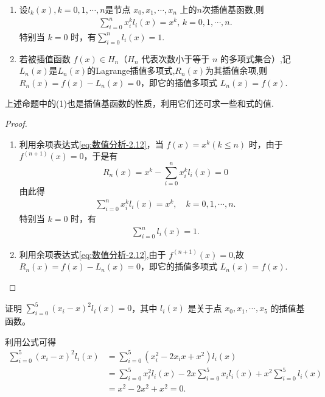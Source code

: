 \documentclass[../../main.tex]{subfiles}
\begin{document}
\begin{proposition}\label{proposition:插值基函数和插值余项的性质}
\begin{enumerate}[(1)]
\item 设$l_k(x),k=0,1,\cdots,n$是节点 $x_0, x_1, \cdots, x_n$ 上的$n$次插值基函数,则
\begin{align*}
\sum_{i = 0}^n x_i^k l_i(x) = x^k, \, k = 0, 1, \cdots, n.
\end{align*}
特别当 $k = 0$ 时，有$\sum_{i = 0}^n l_i(x) = 1.$

\item 若被插值函数 $f(x) \in H_n$（$H_n$ 代表次数小于等于 $n$ 的多项式集合）,记$L_n(x)$是$L_n(x)$的Lagrange插值多项式,$R_n(x)$为其插值余项,则 $R_n(x) = f(x) - L_n(x) = 0$，即它的插值多项式 $L_n(x) = f(x)$.
\end{enumerate}
\end{proposition}
\begin{note}
上述命题中的(1)也是插值基函数的性质，利用它们还可求一些和式的值.
\end{note}
\begin{proof}
\begin{enumerate}[(1)]
\item 利用余项表达式\eqref{eq:数值分析-2.12}，当 $f(x) = x^k (k \leqslant n)$ 时，由于 $f^{(n + 1)}(x) = 0$，于是有 
\[
R_n(x) = x^k - \sum_{i = 0}^n x_i^k l_i(x) = 0
\]
由此得 
\begin{align*}
\sum_{i = 0}^n x_i^k l_i(x) = x^k, \quad k = 0, 1, \cdots, n.
\end{align*}
特别当 $k = 0$ 时，有 
\begin{align*}
\sum_{i = 0}^n l_i(x) = 1.
\end{align*}

\item 利用余项表达式\eqref{eq:数值分析-2.12},由于 $f^{(n + 1)}(x) = 0$,故 $R_n(x) = f(x) - L_n(x) = 0$，即它的插值多项式 $L_n(x) = f(x)$.
\end{enumerate}

\end{proof}

\begin{example}
证明 $\sum_{i = 0}^5 (x_i - x)^2 l_i(x) = 0$，其中 $l_i(x)$ 是关于点 $x_0, x_1, \cdots, x_5$ 的插值基函数。
\end{example}
\begin{solution}
利用公式可得 
\begin{align*}
\sum_{i = 0}^5 (x_i - x)^2 l_i(x) &= \sum_{i = 0}^5 (x_i^2 - 2x_i x + x^2) l_i(x) \\
&= \sum_{i = 0}^5 x_i^2 l_i(x) - 2x \sum_{i = 0}^5 x_i l_i(x) + x^2 \sum_{i = 0}^5 l_i(x) \\
&= x^2 - 2x^2 + x^2 = 0.
\end{align*}

\end{solution}
\end{document}
